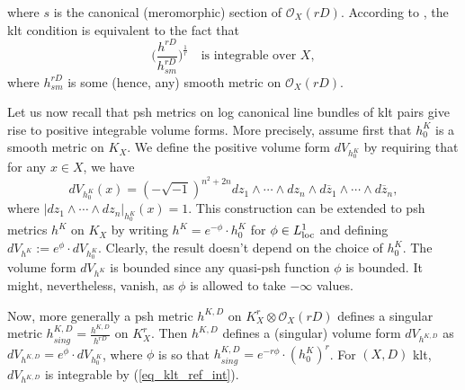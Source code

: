 \documentclass[12pt]{article}
\numberwithin{equation}{section}
\theoremstyle{theorem}
\theoremstyle{definition}
\theoremstyle{remark}
\newcommand{\imun} {\sqrt{-1}}
\begin{document}
	where $s$ is the canonical (meromorphic) section of $\mathscr{O}_X(r D)$.
	According to \cite[Proposition 3.20]{KollarPairs}, the klt condition is equivalent to the fact that
	\begin{equation}\label{eq_klt_ref_int}
		\Big( \frac{h^{r D}}{h^{r D}_{sm}} \Big)^{\frac{1}{r}} \quad \text{is integrable over } X,
	\end{equation}
	where $h^{r D}_{sm}$ is some (hence, any) smooth metric on $\mathscr{O}_X(r D)$.
	\par 
	Let us now recall that psh metrics on log canonical line bundles of klt pairs give rise to positive integrable volume forms.
	More precisely, assume first that $h^K_0$ is a smooth metric on $K_X$.
	We define the positive volume form $dV_{h^K_0}$ by requiring that for any $x \in X$, we have
	\begin{equation}\label{eq_vol_f_defn_sm}
		dV_{h^K_0}(x) 
		=
		(-\imun)^{n^2 + 2n} dz_1 \wedge \cdots \wedge dz_n \wedge d\overline{z}_1 \wedge \cdots \wedge d\overline{z}_n,
	\end{equation}
	where $| dz_1 \wedge \cdots \wedge dz_n |_{h^K_0}(x) = 1$.
	This construction can be extended to psh metrics $h^K$ on $K_X$ by writing $h^K = e^{- \phi} \cdot h^K_0$ for $\phi \in L^1_{{\rm{loc}}}$ and defining $dV_{h^K} := e^{\phi} \cdot dV_{h^K_0}$.
	Clearly, the result doesn't depend on the choice of $h^K_0$.
	The volume form $dV_{h^K}$ is bounded since any quasi-psh function $\phi$ is bounded. 
	It might, nevertheless, vanish, as $\phi$ is allowed to take $- \infty$ values.
	\par 
	Now, more generally a psh metric $h^{K, D}$ on $K_X^r \otimes \mathscr{O}_X(rD)$ defines a singular metric $h^{K, D}_{sing} = \frac{h^{K, D}}{h^{rD}}$ on $K_X^{r}$. 
	Then $h^{K, D}$ defines a (singular) volume form $dV_{h^{K, D}}$ as $dV_{h^{K, D}} = e^{\phi} \cdot dV_{h^K_0}$, where $\phi$ is so that $h^{K, D}_{sing} = e^{- r \phi} \cdot (h^K_0)^{r}$.
	For $(X, D)$ klt, $dV_{h^{K, D}}$ is integrable by (\ref{eq_klt_ref_int}).
\end{document}
